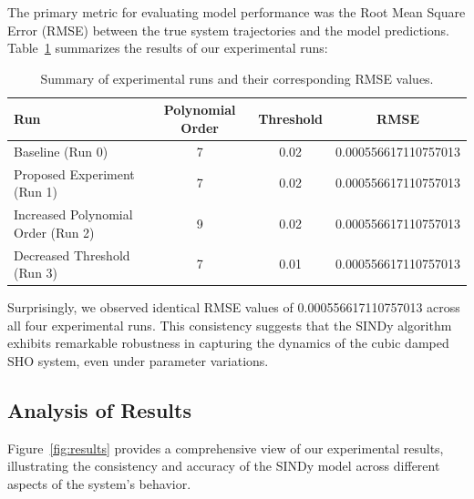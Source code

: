 \documentclass{article} %
\begin{document}
The primary metric for evaluating model performance was the Root Mean Square Error (RMSE) between the true system trajectories and the model predictions. Table~\ref{tab:experimental_runs} summarizes the results of our experimental runs:

\begin{table}[h]
\centering
\begin{tabular}{lccc}
\toprule
\textbf{Run} & \textbf{Polynomial Order} & \textbf{Threshold} & \textbf{RMSE} \\
\midrule
Baseline (Run 0) & 7 & 0.02 & 0.000556617110757013 \\
Proposed Experiment (Run 1) & 7 & 0.02 & 0.000556617110757013 \\
Increased Polynomial Order (Run 2) & 9 & 0.02 & 0.000556617110757013 \\
Decreased Threshold (Run 3) & 7 & 0.01 & 0.000556617110757013 \\
\bottomrule
\end{tabular}
\caption{Summary of experimental runs and their corresponding RMSE values.}
\label{tab:experimental_runs}
\end{table}

Surprisingly, we observed identical RMSE values of 0.000556617110757013 across all four experimental runs. This consistency suggests that the SINDy algorithm exhibits remarkable robustness in capturing the dynamics of the cubic damped SHO system, even under parameter variations.

\subsection{Analysis of Results}

Figure~\ref{fig:results} provides a comprehensive view of our experimental results, illustrating the consistency and accuracy of the SINDy model across different aspects of the system's behavior.
\end{document}
